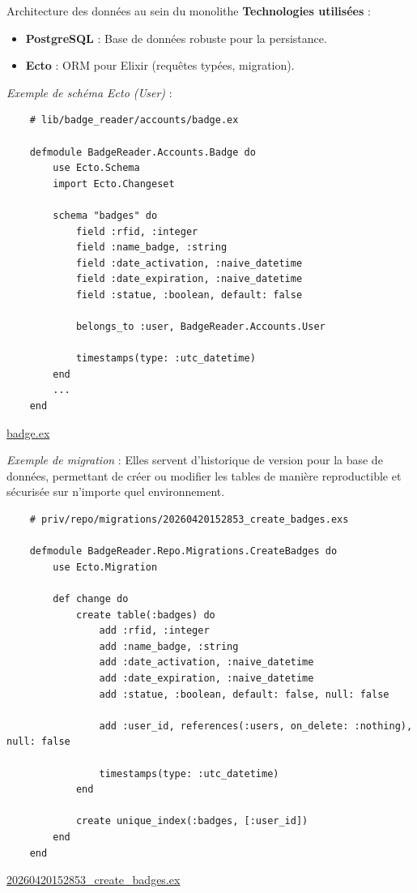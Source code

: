 \begin{for_you}{Architecture des données au sein du monolithe}
    \textbf{Technologies utilisées} :
    \begin{itemize}
        \item \textbf{PostgreSQL} : Base de données robuste pour la persistance.
        \item \textbf{Ecto} : ORM pour Elixir (requêtes typées, migration).
        \newline
    \end{itemize}

    \textit{Exemple de schéma Ecto (User)} :
    \begin{lstlisting}
    # lib/badge_reader/accounts/badge.ex

    defmodule BadgeReader.Accounts.Badge do
        use Ecto.Schema
        import Ecto.Changeset

        schema "badges" do
            field :rfid, :integer
            field :name_badge, :string
            field :date_activation, :naive_datetime
            field :date_expiration, :naive_datetime
            field :statue, :boolean, default: false

            belongs_to :user, BadgeReader.Accounts.User

            timestamps(type: :utc_datetime)
        end
        ...
    end
    \end{lstlisting}
    \href{https://github.com/Theoden-bernard/badge_reader_project/blob/develop/badge_reader/lib/badge_reader/accounts/badge.ex}{badge.ex}

    \textit{\newline Exemple de migration} :
    Elles servent d'historique de version pour la base de données, permettant de créer ou modifier les tables de manière reproductible et sécurisée sur n'importe quel environnement.
    \begin{lstlisting}
    # priv/repo/migrations/20260420152853_create_badges.exs
    
    defmodule BadgeReader.Repo.Migrations.CreateBadges do
        use Ecto.Migration

        def change do
            create table(:badges) do
                add :rfid, :integer
                add :name_badge, :string
                add :date_activation, :naive_datetime
                add :date_expiration, :naive_datetime
                add :statue, :boolean, default: false, null: false

                add :user_id, references(:users, on_delete: :nothing), null: false

                timestamps(type: :utc_datetime)
            end

            create unique_index(:badges, [:user_id])
        end
    end

    \end{lstlisting}
    \href{https://github.com/Theoden-bernard/badge_reader_project/blob/develop/badge_reader/priv/repo/migrations/20260420152853_create_badges.exs}{20260420152853\_create\_badges.ex}
\end{for_you}


